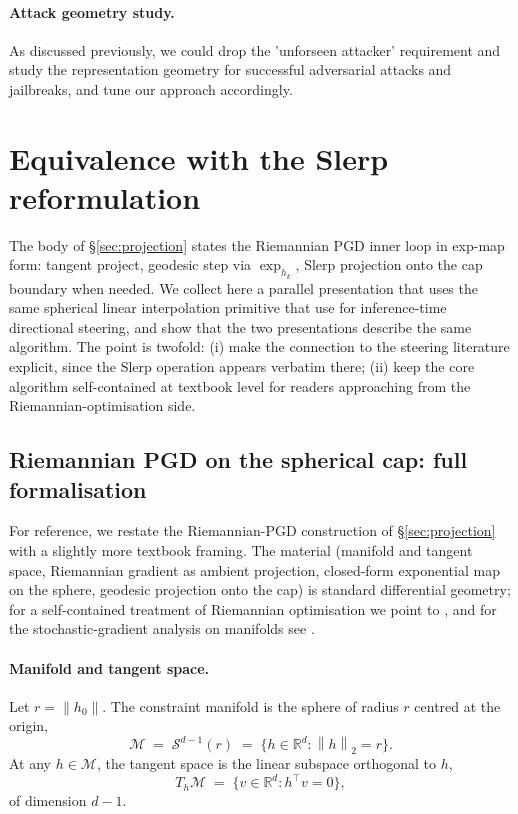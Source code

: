 \documentclass[11pt]{article}
\newcommand{\R}{\mathbb{R}}
\newcommand{\norm}[1]{\left\lVert#1\right\rVert}
\begin{document}
\paragraph{Attack geometry study.}
As discussed previously, we could drop the 'unforseen attacker' requirement and study the representation geometry for successful adversarial attacks and jailbreaks, and tune our approach accordingly.





\appendix

\section{Equivalence with the Slerp reformulation}
\label{app:riemannian}

The body of \S\ref{sec:projection} states the Riemannian PGD inner loop in exp-map form: tangent project, geodesic step via $\exp_{h_k}$, Slerp projection onto the cap boundary when needed. We collect here a parallel presentation that uses the same spherical linear interpolation primitive that \citet{you2026spherical} use for inference-time directional steering, and show that the two presentations describe the same algorithm. The point is twofold: (i) make the connection to the steering literature explicit, since the Slerp operation appears verbatim there; (ii) keep the core algorithm self-contained at textbook level for readers approaching from the Riemannian-optimisation side.

\subsection*{Riemannian PGD on the spherical cap: full formalisation}

For reference, we restate the Riemannian-PGD construction of \S\ref{sec:projection} with a slightly more textbook framing. The material (manifold and tangent space, Riemannian gradient as ambient projection, closed-form exponential map on the sphere, geodesic projection onto the cap) is standard differential geometry; for a self-contained treatment of Riemannian optimisation we point to \citet{boumal2023introduction}, and for the stochastic-gradient analysis on manifolds see \citet{bonnabel2013stochastic, tripuraneni2018averaging}.

\paragraph{Manifold and tangent space.} Let $r = \norm{h_0}$. The constraint manifold is the sphere of radius $r$ centred at the origin,
\begin{equation*}
\mathcal{M} \;=\; \mathcal{S}^{d-1}(r) \;=\; \big\{ h \in \R^d : \norm{h}_2 = r \big\}.
\end{equation*}
At any $h \in \mathcal{M}$, the tangent space is the linear subspace orthogonal to $h$,
\begin{equation*}
T_h \mathcal{M} \;=\; \big\{ v \in \R^d : h^\top v = 0 \big\},
\end{equation*}
of dimension $d-1$.
\end{document}
